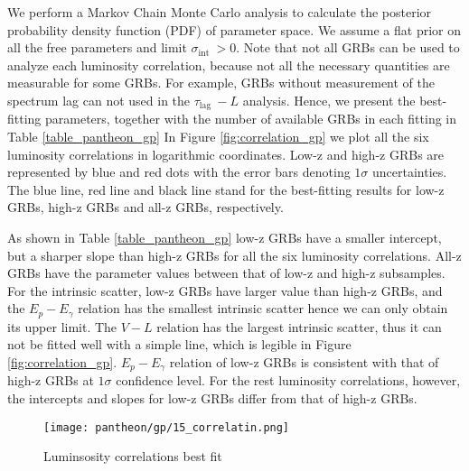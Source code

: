 We perform a Markov Chain Monte Carlo analysis to calculate the posterior probability density function (PDF) of parameter space. We assume a flat prior on all the free parameters and limit $\sigma_{\text {int }}>0$. Note that not all GRBs can be used to analyze each luminosity correlation, because not all the necessary quantities are measurable for some GRBs. For example, GRBs without measurement of the spectrum lag can not used in the $\tau_{\text {lag }}-L$ analysis. Hence, we present the best-fitting parameters, together with the number of available GRBs in each fitting in Table \eqref{table_pantheon_gp} In Figure \eqref{fig:correlation_gp} we plot all the six luminosity correlations in logarithmic coordinates. Low-z and high-z GRBs are represented by blue and red dots with the error bars denoting $1 \sigma$ uncertainties. The blue line, red line and black line stand for the best-fitting results for low-z GRBs, high-z GRBs and all-z GRBs, respectively.

As shown in Table \eqref{table_pantheon_gp} low-z GRBs have a smaller intercept, but a sharper slope than high-z GRBs for all the six luminosity correlations. All-z GRBs have the parameter values between that of low-z and high-z subsamples. For the intrinsic scatter, low-z GRBs have larger value than high-z GRBs, and the $E_{p}-E_{\gamma}$ relation has the smallest intrinsic scatter hence we can only obtain its upper limit. The $V-L$ relation has the largest intrinsic scatter, thus it can not be fitted well with a simple line, which is legible in Figure \eqref{fig:correlation_gp}. $E_{p}-E_{\gamma}$ relation of low-z GRBs is consistent with that of high-z GRBs at $1 \sigma$ confidence level. For the rest luminosity correlations, however, the intercepts and slopes for low-z GRBs differ from that of high-z GRBs.

\begin{figure}[H]
	\centering
	\texttt{[image: pantheon/gp/15\_correlatin.png]}
	\caption{Luminsosity correlations best fit}
	\label{fig:correlation_gp}
\end{figure}
